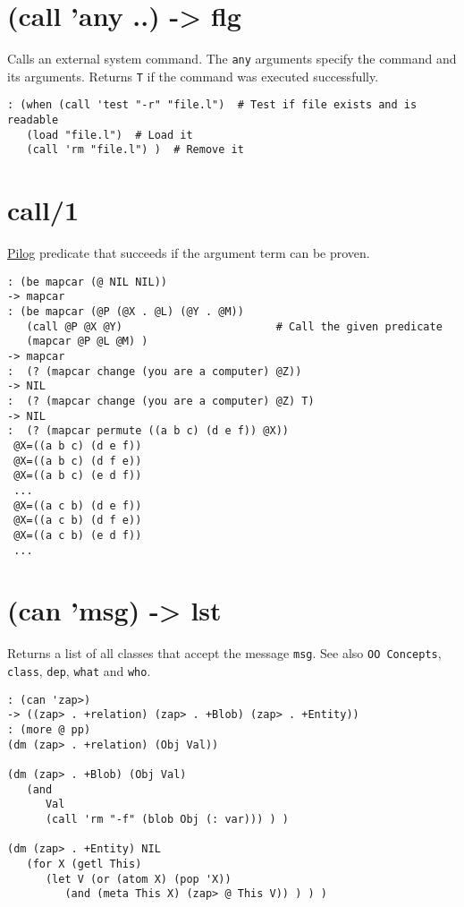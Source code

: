 { 
\section{(call 'any ..) -> flg}
\label{sec-8-1-3-3}


Calls an external system command. The \texttt{any} arguments specify the
command and its arguments. Returns \texttt{T} if the command was executed
successfully.


\begin{verbatim}
: (when (call 'test "-r" "file.l")  # Test if file exists and is readable
   (load "file.l")  # Load it
   (call 'rm "file.l") )  # Remove it
\end{verbatim}

 
\section{call/1}
\label{sec-8-1-3-4}


\hyperref[ref.html-pilog]{Pilog} predicate that succeeds if the argument term
can be proven.


\begin{verbatim}
: (be mapcar (@ NIL NIL))
-> mapcar
: (be mapcar (@P (@X . @L) (@Y . @M))
   (call @P @X @Y)                        # Call the given predicate
   (mapcar @P @L @M) )
-> mapcar
:  (? (mapcar change (you are a computer) @Z))
-> NIL
:  (? (mapcar change (you are a computer) @Z) T)
-> NIL
:  (? (mapcar permute ((a b c) (d e f)) @X))
 @X=((a b c) (d e f))
 @X=((a b c) (d f e))
 @X=((a b c) (e d f))
 ...
 @X=((a c b) (d e f))
 @X=((a c b) (d f e))
 @X=((a c b) (e d f))
 ...
\end{verbatim}

 
\section{(can 'msg) -> lst}
\label{sec-8-1-3-5}


Returns a list of all classes that accept the message \texttt{msg}. See also
\texttt{OO Concepts}, \texttt{class}, \texttt{dep}, \texttt{what} and \texttt{who}.


\begin{verbatim}
: (can 'zap>)
-> ((zap> . +relation) (zap> . +Blob) (zap> . +Entity))
: (more @ pp)
(dm (zap> . +relation) (Obj Val))

(dm (zap> . +Blob) (Obj Val)
   (and
      Val
      (call 'rm "-f" (blob Obj (: var))) ) )

(dm (zap> . +Entity) NIL
   (for X (getl This)
      (let V (or (atom X) (pop 'X))
         (and (meta This X) (zap> @ This V)) ) ) )


\end{verbatim}}
